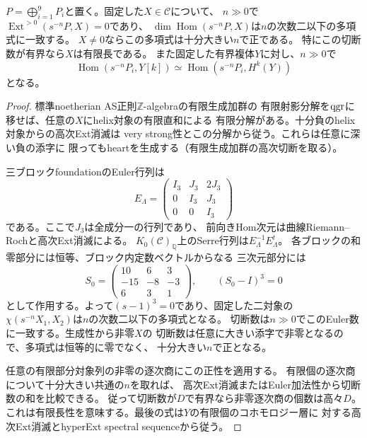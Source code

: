 \begin{lemma}[helix切断と有限長判定]\label{lem:ou-residual-helix-growth}
$P=\bigoplus_{i=1}^9P_i$と置く。固定した$X\in\mathcal C$について、
$n\gg0$で$\operatorname{Ext}^{>0}(s^{-n}P,X)=0$であり、
$\dim\operatorname{Hom}(s^{-n}P,X)$は$n$の次数二以下の多項式に一致する。
$X\ne0$ならこの多項式は十分大きい$n$で正である。
特にこの切断数が有界なら$X$は有限長である。
また固定した有界複体$Y$に対し、$n\gg0$で
\[
 \operatorname{Hom}(s^{-n}P_i,Y[k])
 \simeq\operatorname{Hom}(s^{-n}P_i,H^k(Y))
\]
となる。
\end{lemma}
\begin{proof}
標準noetherian AS正則$\mathbb Z$-algebraの有限生成加群の
有限射影分解を$\operatorname{qgr}$に移せば、任意の$X$にhelix対象の有限直和による
有限分解がある。十分負のhelix対象からの高次Ext消滅は
very strong性とこの分解から従う。これらは任意に深い負の添字に
限ってもheartを生成する（有限生成加群の高次切断を取る）。

三ブロックfoundationのEuler行列は
\[
 E_\Lambda=
 \begin{pmatrix}I_3&J_3&2J_3\\0&I_3&J_3\\0&0&I_3\end{pmatrix}
\]
である。ここで$J_3$は全成分一の行列であり、
前向きHom次元は曲線Riemann--Rochと高次Ext消滅による。
$K_0(\mathcal C)_\mathbb Q$上のSerre行列は$E_\Lambda^{-1}E_\Lambda^t$。
各ブロックの和零部分には恒等、ブロック内定数ベクトルからなる
三次元部分には
\[
 S_0=\begin{pmatrix}10&6&3\\-15&-8&-3\\6&3&1\end{pmatrix},
 \qquad (S_0-I)^3=0
\]
として作用する。よって$(s-1)^3=0$であり、固定した二対象の
$\chi(s^{-n}X_1,X_2)$は$n$の次数二以下の多項式となる。
切断数は$n\gg0$でこのEuler数に一致する。生成性から非零$X$の
切断数は任意に大きい添字で非零となるので、多項式は恒等的に零でなく、
十分大きい$n$で正となる。

任意の有限部分対象列の非零の逐次商にこの正性を適用する。
有限個の逐次商について十分大きい共通の$n$を取れば、
高次Ext消滅またはEuler加法性から切断数の和を比較できる。
従って切断数が$D$で有界なら非零逐次商の個数は高々$D$。
これは有限長性を意味する。最後の式は$Y$の有限個のコホモロジー層に
対する高次Ext消滅とhyperExt spectral sequenceから従う。
\end{proof}

